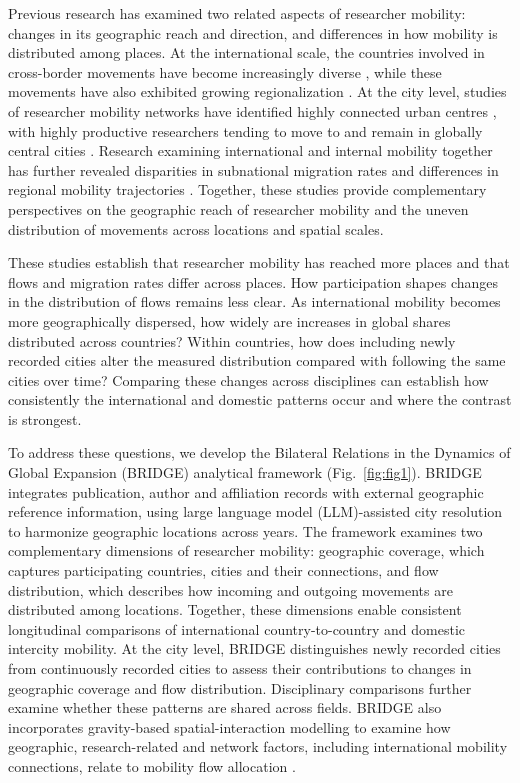 Previous research has examined two related aspects of researcher mobility: changes in its geographic reach and direction, and differences in how mobility is distributed among places. At the international scale, the countries involved in cross-border movements have become increasingly diverse \cite{ref008}, while these movements have also exhibited growing regionalization \cite{ref038}. At the city level, studies of researcher mobility networks have identified highly connected urban centres \cite{ref026}, with highly productive researchers tending to move to and remain in globally central cities \cite{ref031}. Research examining international and internal mobility together has further revealed disparities in subnational migration rates and differences in regional mobility trajectories \cite{ref029,ref030}. Together, these studies provide complementary perspectives on the geographic reach of researcher mobility and the uneven distribution of movements across locations and spatial scales.

These studies establish that researcher mobility has reached more places\cite{ref008} and that flows and migration rates differ across places\cite{ref031,ref029}. How participation shapes changes in the distribution of flows remains less clear. As international mobility becomes more geographically dispersed, how widely are increases in global shares distributed across countries? Within countries, how does including newly recorded cities alter the measured distribution compared with following the same cities over time? Comparing these changes across disciplines can establish how consistently the international and domestic patterns occur and where the contrast is strongest.

To address these questions, we develop the Bilateral Relations in the Dynamics of Global Expansion (BRIDGE) analytical framework (Fig.~\ref{fig:fig1}). BRIDGE integrates publication, author and affiliation records with external geographic reference information, using large language model (LLM)-assisted city resolution to harmonize geographic locations across years. The framework examines two complementary dimensions of researcher mobility: geographic coverage, which captures participating countries, cities and their connections, and flow distribution, which describes how incoming and outgoing movements are distributed among locations. Together, these dimensions enable consistent longitudinal comparisons of international country-to-country and domestic intercity mobility. At the city level, BRIDGE distinguishes newly recorded cities from continuously recorded cities to assess their contributions to changes in geographic coverage and flow distribution. Disciplinary comparisons further examine whether these patterns are shared across fields. BRIDGE also incorporates gravity-based spatial-interaction modelling to examine how geographic, research-related and network factors, including international mobility connections, relate to mobility flow allocation \cite{lenormand2016}.

